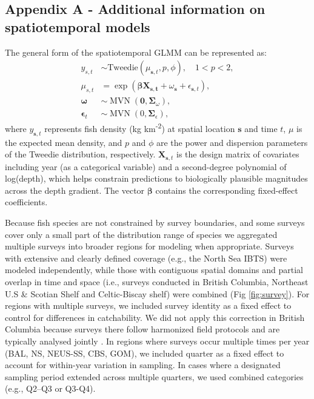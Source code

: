 \documentclass[9pt,twoside,lineno]{pnas-new}
\begin{document}
\clearpage

\subsection*{Appendix A - Additional information on spatiotemporal models}\label{sec:A}

The general form of the spatiotemporal GLMM can be represented as:
\begin{align}
    y_{s,t} &\sim \text{Tweedie} \left( \mu_{\mathbf{s},t}, p, \phi \right), \quad 1 < p < 2, \label{eq:1} \\
    \mu_{s,t} &= \exp \left(\boldsymbol{\beta} \boldsymbol{\text{X}_{\boldsymbol{s},t}}  + \omega_{\boldsymbol{s}} + \epsilon_{\boldsymbol{s},t} \right), \label{eq:2} \\
    \boldsymbol{\omega} &\sim \operatorname{MVN} \left(\boldsymbol{0}, \boldsymbol{\Sigma}_{\omega} \right), \label{eq:3} \\
    \boldsymbol{\epsilon}_{t} &\sim \operatorname{MVN} \left(0, \boldsymbol{\Sigma}_{\epsilon} \right), \label{eq:4}
\end{align}
where \( y_{\mathbf{s},t} \) represents fish density (kg km\textsuperscript{-2}) at spatial location \( \mathbf{s} \) and time \( t \), \( \mu \) is the expected mean density, and \( p \) and \( \phi \) are the power and dispersion parameters of the Tweedie distribution, respectively. \( \mathbf{X}_{\mathbf{s},t} \) is the design matrix of covariates including year (as a categorical variable) and a second-degree polynomial of log(depth), which helps constrain predictions to biologically plausible magnitudes across the depth gradient. The vector \( \boldsymbol{\beta} \) contains the corresponding fixed-effect coefficients.

Because fish species are not constrained by survey boundaries, and some surveys cover only a small part of the distribution range of species we aggregated multiple surveys into broader regions for modeling when appropriate. Surveys with extensive and clearly defined coverage (e.g., the North Sea IBTS) were modeled independently, while those with contiguous spatial domains and partial overlap in time and space (i.e., surveys conducted in British Columbia, Northeast U.S \& Scotian Shelf and Celtic-Biscay shelf) were combined (Fig \ref{fig:survey}). For regions with multiple surveys, we included survey identity as a fixed effect to control for differences in catchability. We did not apply this correction in British Columbia because surveys there follow harmonized field protocols and are typically analysed jointly \citep[e.g.,][]{Anderson2019BCGroundfish, WardWin2024}. In regions where surveys occur multiple times per year (BAL, NS, NEUS-SS, CBS, GOM), we included quarter as a fixed effect to account for within-year variation in sampling. In cases where a designated sampling period extended across multiple quarters, we used combined categories (e.g., Q2–Q3 or Q3-Q4).
\end{document}
